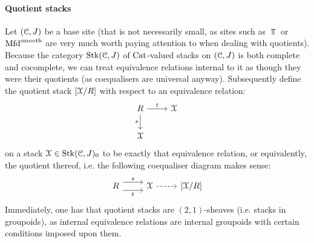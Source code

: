                 \paragraph{Quotient stacks}
                    \begin{definition} \label{def: quotient_stacks} 
                        Let $(\mathcal{C}, J)$ be a base site (that is not necessarily small, as sites such as $\Top$ or $\mathrm{Mfd}^{\mathrm{smooth}}$ are very much worth paying attention to when dealing with quotients). Because the category $\mathrm{Stk}(\mathcal{C}, J)$ of $\mathrm{Cat}$-valued stacks on $(\mathcal{C}, J)$ is both complete and cocomplete, we can treat equivalence relations internal to it as though they were their quotients (as coequalisers are universal anyway). Subsequently define the quotient stack $[\mathcal{X}/R]$ with respect to an equivalence relation:
                            $$
                                \begin{tikzcd}
                                	R & \calX \\
                                	\calX
                                	\arrow["s"', from=1-1, to=2-1]
                                	\arrow["t", from=1-1, to=1-2]
                                \end{tikzcd}
                            $$
                        on a stack $\mathcal{X} \in \mathrm{Stk}(\mathcal{C}, J)_0$ to be exactly that equivalence relation, or equivalently, the quotient thereof, i.e. the following coequaliser diagram makes sense:
                            $$
                                \begin{tikzcd}
                                	R & \calX & {[\calX/R]}
                                	\arrow["s", shift left=2, from=1-1, to=1-2]
                                	\arrow["t"', shift right=2, from=1-1, to=1-2]
                                	\arrow[dashed, from=1-2, to=1-3]
                                \end{tikzcd}
                            $$
                        Immediately, one has that quotient stacks are $(2,1)$-sheaves (i.e. stacks in groupoids), as internal equivalence relations are internal groupoids with certain conditions imposed upon them. 
                    \end{definition}
                    
                    \begin{example}
                        
                    \end{example}
            
